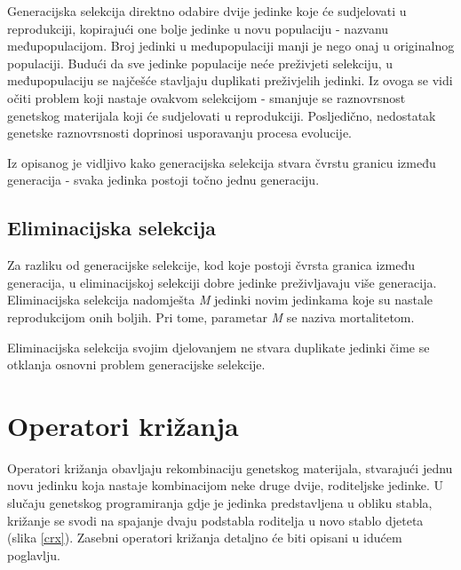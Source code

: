 Generacijska selekcija direktno odabire dvije jedinke koje će sudjelovati u reprodukciji, kopirajući one bolje jedinke u novu populaciju - nazvanu međupopulacijom. Broj jedinki u međupopulaciji manji je nego onaj u originalnog populaciji. Budući da sve jedinke populacije neće preživjeti selekciju, u međupopulaciju se najčešće stavljaju duplikati preživjelih jedinki. Iz ovoga se vidi očiti problem koji nastaje ovakvom selekcijom - smanjuje se raznovrsnost genetskog materijala koji će sudjelovati u reprodukciji. Posljedično, nedostatak genetske raznovrsnosti doprinosi usporavanju procesa evolucije.

Iz opisanog je vidljivo kako generacijska selekcija stvara čvrstu granicu između generacija - svaka jedinka postoji točno jednu generaciju.


\subsection{Eliminacijska selekcija}

Za razliku od generacijske selekcije, kod koje postoji čvrsta granica između generacija, u eliminacijskoj selekciji dobre jedinke preživljavaju više generacija. Eliminacijska selekcija nadomješta \textit{M} jedinki novim jedinkama koje su nastale reprodukcijom onih boljih. Pri tome, parametar \textit{M} se naziva mortalitetom.

Eliminacijska selekcija svojim djelovanjem ne stvara duplikate jedinki čime se otklanja osnovni problem generacijske selekcije.

\section{Operatori križanja}

Operatori križanja obavljaju rekombinaciju genetskog materijala, stvarajući jednu novu jedinku koja nastaje kombinacijom neke druge dvije, roditeljske jedinke. U slučaju genetskog programiranja gdje je jedinka predstavljena u obliku stabla, križanje se svodi na spajanje dvaju podstabla roditelja u novo stablo djeteta (slika \ref{crx}). Zasebni operatori križanja detaljno će biti opisani u idućem poglavlju.

